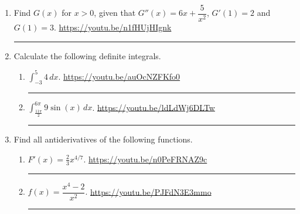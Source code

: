 \documentclass[12pt]{article}
\newcommand{\ds}{\displaystyle}
\begin{document}
\begin{enumerate}


\item Find $G(x)$ for $x > 0$, given that $G''(x) = 6x + \dfrac{5}{x^2}$, $G'(1) = 2$ and $G(1) = 3$. 
\vfill
\vfill
\hfill \url{https://youtu.be/n1fHUjHIgnk}
\hrule

\newpage
\item Calculate the following definite integrals.
\begin{enumerate}
\item $\ds \int_{-3}^5  4 \, dx$. 
\vfill
\hfill \url{https://youtu.be/auOcNZFKfo0}
\hrule

\item $\ds \int_{\tfrac{11\pi}{2}}^{6\pi}  9 \sin (x) \, dx$. 
\vfill
\hfill \url{https://youtu.be/ldLdWj6DLTw}
\hrule
\end{enumerate}


\item Find all antiderivatives of the following functions. 
\begin{enumerate}
\item $F'(x)= \tfrac{2}{3} x^{4/7}$. 
\vfill
\hfill \url{https://youtu.be/n0PeFRNAZ9c}
\hrule

\item $f(x) = \dfrac{x^4 - 2}{x^2}.$
\vfill
\hfill \url{https://youtu.be/PJFdN3E3mmo}
\hrule


\end{enumerate}
\end{enumerate}
\end{document}
